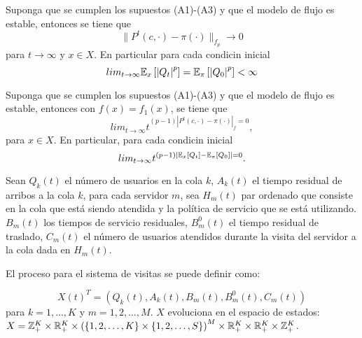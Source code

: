 \begin{Teo}\label{Tma.6.2}
Suponga que se cumplen los supuestos (A1)-(A3) y que el modelo de
flujo es estable, entonces se tiene que
\[\parallel P^{t}\left(c,\cdot\right)-\pi\left(\cdot\right)\parallel_{f_{p}}\rightarrow0\]
para $t\rightarrow\infty$ y $x\in X$. En particular para cada
condicin inicial
\[lim_{t\rightarrow\infty}\mathbb{E}_{x}\left[\left|Q_{t}\right|^{p}\right]=\mathbb{E}_{\pi}\left[\left|Q_{0}\right|^{p}\right]<\infty\]
\end{Teo}


\begin{Teo}\label{Tma.6.3}
Suponga que se cumplen los supuestos (A1)-(A3) y que el modelo de
flujo es estable, entonces con
$f\left(x\right)=f_{1}\left(x\right)$, se tiene que
\[lim_{t\rightarrow\infty}t^{(p-1)\left|P^{t}\left(c,\cdot\right)-\pi\left(\cdot\right)\right|_{f}=0},\]
para $x\in X$. En particular, para cada condicin inicial
\[lim_{t\rightarrow\infty}t^{(p-1)\left|\mathbb{E}_{x}\left[Q_{t}\right]-\mathbb{E}_{\pi}\left[Q_{0}\right]\right|=0}.\]
\end{Teo}




Sean $Q_{k}\left(t\right)$ el n\'umero de usuarios en la cola $k$,
$A_{k}\left(t\right)$ el tiempo residual de arribos a la cola $k$,
para cada servidor $m$, sea $H_{m}\left(t\right)$ par ordenado que
consiste en la cola que est\'a siendo atendida y la pol\'itica de
servicio que se est\'a utilizando. $B_{m}\left(t\right)$ los
tiempos de servicio residuales, $B_{m}^{0}\left(t\right)$ el
tiempo residual de traslado, $C_{m}\left(t\right)$ el n\'umero de
usuarios atendidos durante la visita del servidor a la cola dada
en $H_{m}\left(t\right)$.

El proceso para el sistema de visitas se puede definir como:

\begin{equation}\label{Esp.Edos.Down}
X\left(t\right)^{T}=\left(Q_{k}\left(t\right),A_{k}\left(t\right),B_{m}\left(t\right),B_{m}^{0}\left(t\right),C_{m}\left(t\right)\right)
\end{equation}
para $k=1,\ldots,K$ y $m=1,2,\ldots,M$. $X$ evoluciona en el
espacio de estados:
$X=\mathbb{Z}_{+}^{K}\times\mathbb{R}_{+}^{K}\times\left(\left\{1,2,\ldots,K\right\}\times\left\{1,2,\ldots,S\right\}\right)^{M}\times\mathbb{R}_{+}^{K}\times\mathbb{R}_{+}^{K}\times\mathbb{Z}_{+}^{K}$.\\

